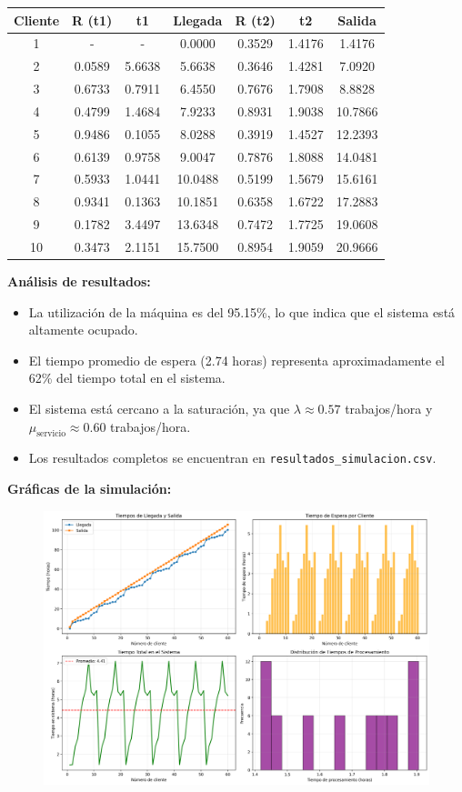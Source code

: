 \documentclass{article}
\begin{document}
\vspace{0.3cm}
\begin{center}
\small
\begin{tabular}{|c|c|c|c|c|c|c|}
\hline
\textbf{Cliente} & \textbf{R (t1)} & \textbf{t1} & \textbf{Llegada} & \textbf{R (t2)} & \textbf{t2} & \textbf{Salida} \\
\hline
1 & - & - & 0.0000 & 0.3529 & 1.4176 & 1.4176 \\
2 & 0.0589 & 5.6638 & 5.6638 & 0.3646 & 1.4281 & 7.0920 \\
3 & 0.6733 & 0.7911 & 6.4550 & 0.7676 & 1.7908 & 8.8828 \\
4 & 0.4799 & 1.4684 & 7.9233 & 0.8931 & 1.9038 & 10.7866 \\
5 & 0.9486 & 0.1055 & 8.0288 & 0.3919 & 1.4527 & 12.2393 \\
6 & 0.6139 & 0.9758 & 9.0047 & 0.7876 & 1.8088 & 14.0481 \\
7 & 0.5933 & 1.0441 & 10.0488 & 0.5199 & 1.5679 & 15.6161 \\
8 & 0.9341 & 0.1363 & 10.1851 & 0.6358 & 1.6722 & 17.2883 \\
9 & 0.1782 & 3.4497 & 13.6348 & 0.7472 & 1.7725 & 19.0608 \\
10 & 0.3473 & 2.1151 & 15.7500 & 0.8954 & 1.9059 & 20.9666 \\
\hline
\end{tabular}
\end{center}

\newpage

\textbf{Análisis de resultados:}

\begin{itemize}
    \item La utilización de la máquina es del 95.15\%, lo que indica que el sistema está altamente ocupado.
    \item El tiempo promedio de espera (2.74 horas) representa aproximadamente el 62\% del tiempo total en el sistema.
    \item El sistema está cercano a la saturación, ya que $\lambda \approx 0.57$ trabajos/hora y $\mu_{\text{servicio}} \approx 0.60$ trabajos/hora.
    \item Los resultados completos se encuentran en \texttt{resultados\_simulacion.csv}.
\end{itemize}

\vspace{0.5cm}
\textbf{Gráficas de la simulación:}

\begin{figure}[h]
\centering
\includegraphics[width=\textwidth]{simulacion_taller.png}
\end{figure}
\end{document}
